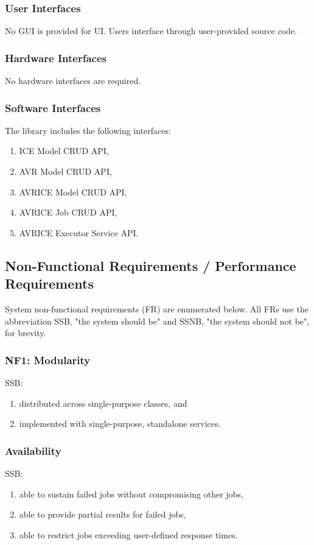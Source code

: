 \documentclass[12pt,a4paper]{article}
\begin{document}
\subsubsection{User Interfaces}
No GUI is provided for UI.
Users interface through user-provided source code.

\subsubsection{Hardware Interfaces}
No hardware interfaces are required.

\subsubsection{Software Interfaces}
The library includes the following interfaces:

\begin{enumerate}
    \item ICE Model CRUD API,
    \item AVR Model CRUD API,
    \item AVRICE Model CRUD API,
    \item AVRICE Job CRUD API,
    \item AVRICE Executor Service API.
\end{enumerate}

\subsection{Non-Functional Requirements / Performance Requirements}
System non-functional requirements (FR) are enumerated below.
All FRs use the abbreviation SSB, "the system should be" and 
SSNB, "the system should not be", for brevity.

\subsubsection{NF1: Modularity}
SSB:
\begin{enumerate}
    \item distributed across single-purpose classes, and
    \item implemented with single-purpose, standalone services.
\end{enumerate}
\subsubsection{Availability}
SSB:
\begin{enumerate}
    \item able to sustain failed jobs without compromising other jobs,
    \item able to provide partial results for failed jobs,
    \item able to restrict jobs exceeding user-defined response times.
\end{enumerate}
\end{document}

